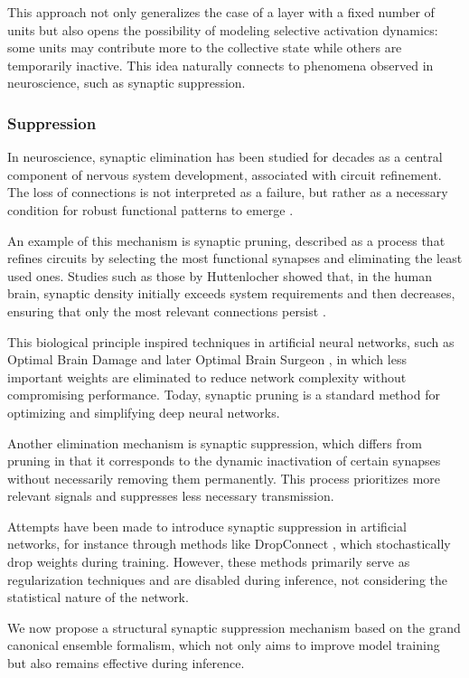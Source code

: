 \documentclass[12pt]{article}
\begin{document}
This approach not only generalizes the case of a layer with a fixed number of units but also opens the possibility of modeling selective activation dynamics: some units may contribute more to the collective state while others are temporarily inactive. This idea naturally connects to phenomena observed in neuroscience, such as synaptic suppression.
\subsubsection*{Suppression}

In neuroscience, synaptic elimination has been studied for decades as a central component of nervous system development, associated with circuit refinement. The loss of connections is not interpreted as a failure, but rather as a necessary condition for robust functional patterns to emerge \cite{huttenlocher1979synaptic}.

An example of this mechanism is synaptic pruning, described as a process that refines circuits by selecting the most functional synapses and eliminating the least used ones. Studies such as those by Huttenlocher showed that, in the human brain, synaptic density initially exceeds system requirements and then decreases, ensuring that only the most relevant connections persist \cite{huttenlocher1979synaptic}.

This biological principle inspired techniques in artificial neural networks, such as Optimal Brain Damage \cite{lecun1989optimal} and later Optimal Brain Surgeon \cite{hassibi1993second}, in which less important weights are eliminated to reduce network complexity without compromising performance. Today, synaptic pruning is a standard method for optimizing and simplifying deep neural networks.

Another elimination mechanism is synaptic suppression, which differs from pruning in that it corresponds to the dynamic inactivation of certain synapses without necessarily removing them permanently. This process prioritizes more relevant signals and suppresses less necessary transmission.

Attempts have been made to introduce synaptic suppression in artificial networks, for instance through methods like DropConnect \cite{wan2013regularization}, which stochastically drop weights during training. However, these methods primarily serve as regularization techniques and are disabled during inference, not considering the statistical nature of the network.

We now propose a structural synaptic suppression mechanism based on the grand canonical ensemble formalism, which not only aims to improve model training but also remains effective during inference.
\end{document}

